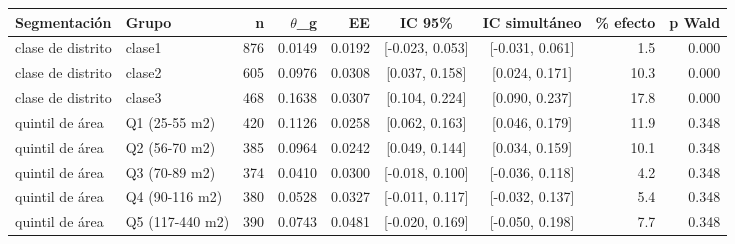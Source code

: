 \begin{tabular}{llrrrccrr}
\toprule
Segmentación & Grupo & n & $\theta$\_g & EE & IC 95\% & IC simultáneo & \% efecto & p Wald \\
\midrule
clase de distrito & clase1 & 876 & 0.0149 & 0.0192 & [-0.023, 0.053] & [-0.031, 0.061] & 1.5 & 0.000 \\
clase de distrito & clase2 & 605 & 0.0976 & 0.0308 & [0.037, 0.158] & [0.024, 0.171] & 10.3 & 0.000 \\
clase de distrito & clase3 & 468 & 0.1638 & 0.0307 & [0.104, 0.224] & [0.090, 0.237] & 17.8 & 0.000 \\
quintil de área & Q1 (25-55 m2) & 420 & 0.1126 & 0.0258 & [0.062, 0.163] & [0.046, 0.179] & 11.9 & 0.348 \\
quintil de área & Q2 (56-70 m2) & 385 & 0.0964 & 0.0242 & [0.049, 0.144] & [0.034, 0.159] & 10.1 & 0.348 \\
quintil de área & Q3 (70-89 m2) & 374 & 0.0410 & 0.0300 & [-0.018, 0.100] & [-0.036, 0.118] & 4.2 & 0.348 \\
quintil de área & Q4 (90-116 m2) & 380 & 0.0528 & 0.0327 & [-0.011, 0.117] & [-0.032, 0.137] & 5.4 & 0.348 \\
quintil de área & Q5 (117-440 m2) & 390 & 0.0743 & 0.0481 & [-0.020, 0.169] & [-0.050, 0.198] & 7.7 & 0.348 \\
\bottomrule
\end{tabular}